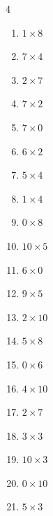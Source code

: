 \begin{multicols}{4}
\begin{enumerate}
  \item $1\times 8$
        \phantom{$=8$}

  \item $7\times 4$
        \phantom{$=28$}

\columnbreak %

  \item $2\times 7$
        \phantom{$=14$}

  \item $7\times 2$
        \phantom{$=14$}

  \item $7\times 0$
        \phantom{$=0$}

  \item $6\times 2$
        \phantom{$=12$}

  \item $5\times 4$
        \phantom{$=20$}

  \item $1\times 4$
        \phantom{$=4$}

  \item $0\times 8$
        \phantom{$=0$}

  \item $10\times 5$
        \phantom{$=50$}

  \item $6\times 0$
        \phantom{$=0$}

  \item $9\times 5$
        \phantom{$=45$}

  \item $2\times 10$
        \phantom{$=20$}

  \item $5\times 8$
        \phantom{$=40$}

  \item $0\times 6$
        \phantom{$=0$}

  \item $4\times 10$
        \phantom{$=40$}

  \item $2\times 7$
        \phantom{$=14$}

  \item $3\times 3$
        \phantom{$=9$}

  \item $10\times 3$
        \phantom{$=30$}

  \item $0\times 10$
        \phantom{$=0$}

  \item $5\times 3$
        \phantom{$=15$}


\end{enumerate}
\end{multicols}
